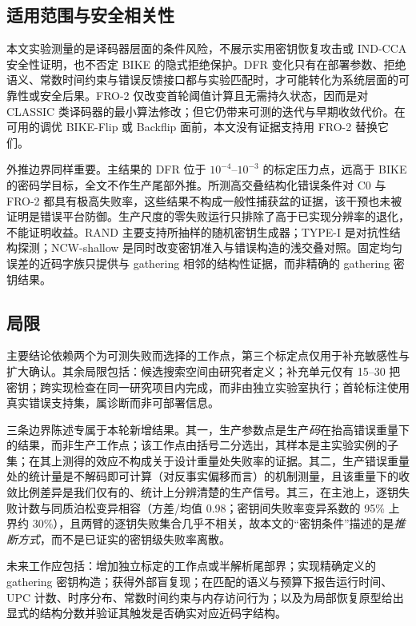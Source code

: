 \documentclass[UTF8,a4paper,10pt,twocolumn]{ctexart}
\begin{document}
\subsection{适用范围与安全相关性}

本文实验测量的是译码器层面的条件风险，不展示实用密钥恢复攻击或 IND-CCA 安全性证明，也不否定 BIKE 的隐式拒绝保护。DFR 变化只有在部署参数、拒绝语义、常数时间约束与错误反馈接口都与实验匹配时，才可能转化为系统层面的可靠性或安全后果。FRO-2 仅改变首轮阈值计算且无需持久状态，因而是对 CLASSIC 类译码器的最小算法修改；但它仍带来可测的迭代与早期收敛代价。在可用的调优 BIKE-Flip 或 Backflip 面前，本文没有证据支持用 FRO-2 替换它们。

外推边界同样重要。主结果的 DFR 位于 $10^{-4}$--$10^{-3}$ 的标定压力点，远高于 BIKE 的密码学目标，全文不作生产尾部外推。所测高交叠结构化错误条件对 C0 与 FRO-2 都具有极高失败率，这些结果不构成一般性捕获盆的证据，该干预也未被证明是错误平台防御。生产尺度的零失败运行只排除了高于已实现分辨率的退化，不能证明收益。RAND 主要支持所抽样的随机密钥生成器；TYPE-I 是对抗性结构探测；NCW-shallow 是同时改变密钥准入与错误构造的浅交叠对照。固定均匀误差的近码字族只提供与 gathering 相邻的结构性证据，而非精确的 gathering 密钥结果。

\subsection{局限}

主要结论依赖两个为可测失败而选择的工作点，第三个标定点仅用于补充敏感性与扩大确认。其余局限包括：候选搜索空间由研究者定义；补充单元仅有 15--30 把密钥；跨实现检查在同一研究项目内完成，而非由独立实验室执行；首轮标注使用真实错误支持集，属诊断而非可部署信息。

三条边界陈述专属于本轮新增结果。其一，生产参数点是生产\emph{码}在抬高错误重量下的结果，而非生产工作点；该工作点由括号二分选出，其样本是主实验实例的子集；在其上测得的效应不构成关于设计重量处失败率的证据。其二，生产错误重量处的统计量是不解码即可计算（对反事实偏移而言）的机制测量，且该重量下的收敛比例差异是我们仅有的、统计上分辨清楚的生产信号。其三，在主池上，逐钥失败计数与同质泊松变异相容（方差/均值 0.98；密钥间失败率变异系数的 95\% 上界约 30\%），且两臂的逐钥失败集合几乎不相关，故本文的“密钥条件”描述的是\emph{推断方式}，而不是已证实的密钥级失败率离散。

未来工作应包括：增加独立标定的工作点或半解析尾部界；实现精确定义的 gathering 密钥构造；获得外部盲复现；在匹配的语义与预算下报告运行时间、UPC 计数、时序分布、常数时间约束与内存访问行为；以及为局部恢复原型给出显式的结构分数并验证其触发是否确实对应近码字结构。
\end{document}
